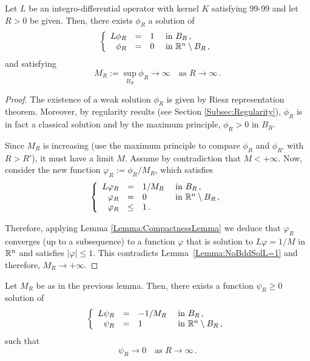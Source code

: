 \begin{lemma}
\label{Lemma:SolBall}
Let $L$ be an integro-differential operator with kernel $K$ satisfying 99-99 and let $R>0$ be given. Then, there exists $\phi_R$ a solution of
\begin{equation*}
\left\{\begin{array}{rcll}
L \phi_R &=& 1 & \textrm{ in } B_R\,,\\
\phi_R &=& 0 & \textrm{ in } \mathbb{R}^n\setminus B_R\,,
\end{array} \right.
\end{equation*}
and satisfying
$$
M_R:= \sup_{B_R} \phi_R \to \infty \quad \text{as } R\to \infty\,.
$$
\end{lemma}
\begin{proof}
The existence of a weak solution $\phi_R$ is given by Riesz representation theorem. Moreover, by regularity results (see Section \ref{Subsec:Regularity}), $\phi_R$ is in fact a classical solution and by the maximum principle, $\phi_R>0$ in $B_R$. 

Since $M_R$ is increasing (use the maximum principle to compare $\phi_R$ and $\phi_{R'}$ with $R>R'$), it must have a limit $M$. Assume by contradiction that $M<+\infty$. Now, consider the new function $ \varphi_R := \phi_R/M_R$, which satisfies
\begin{equation}
\label{Eq:varphi}
\left\{\begin{array}{rcll}
L \varphi_R &=& 1/M_R & \textrm{ in } B_R\,,\\
\varphi_R &=& 0 & \textrm{ in } \mathbb{R}^n\setminus B_R\,, \\
\varphi_R &\leq & 1\,.
\end{array} \right.
\end{equation}

Therefore, applying Lemma \ref{Lemma:CompactnessLemma} we deduce that $\varphi_R$ converges (up to a subsequence) to a function $\varphi$ that is solution to $L \varphi = 1/M$ in $\mathbb{R}^n$ and satisfies  $|\varphi| \leq 1$. This contradicts Lemma~\ref{Lemma:NoBddSolL=1} and therefore, $M_R \to +\infty$.
\end{proof}

\begin{lemma}
\label{Lemma:SolBallToZero}
Let $M_R$ be as in the previous lemma. Then, there exists a function $\psi_R\geq 0$ solution of
\begin{equation*}
\left\{\begin{array}{rcll}
L \psi_R &=& -1/M_R & \textrm{ in } B_R\,,\\
\psi_R &=& 1 & \textrm{ in } \mathbb{R}^n\setminus B_R\,,
\end{array} \right.
\end{equation*}
such that
$$ \psi_R \to  0 \quad \text{as } R\to \infty\,. $$
\end{lemma}

